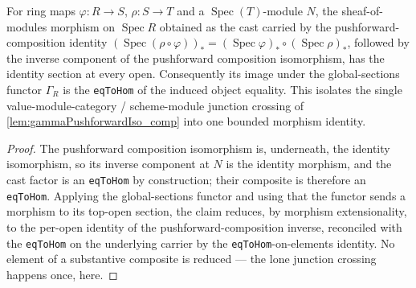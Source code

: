 \begin{lemma}


  \label{lem:gammaPushforwardIso_comp_bridge}
  For ring maps \(\varphi : R \to S\), \(\rho : S \to T\) and a
  \(\operatorname{Spec}(T)\)-module \(N\), the sheaf-of-modules morphism on
  \(\operatorname{Spec} R\) obtained as the cast carried by the pushforward-composition
  identity \((\operatorname{Spec}(\rho\circ\varphi))_* = (\operatorname{Spec}\varphi)_*\circ
  (\operatorname{Spec}\rho)_*\), followed by the inverse component of the pushforward
  composition isomorphism, has the identity section at every open. Consequently its image
  under the global-sections functor \(\Gamma_R\) is the \texttt{eqToHom} of the induced
  object equality. This isolates the single value-module-category / scheme-module junction
  crossing of \cref{lem:gammaPushforwardIso_comp} into one bounded morphism identity.
\end{lemma}

\begin{proof}
  The pushforward composition isomorphism is, underneath, the identity isomorphism, so its
  inverse component at \(N\) is the identity morphism, and the cast factor is an
  \texttt{eqToHom} by construction; their composite is therefore an \texttt{eqToHom}.
  Applying the global-sections functor and using that the functor sends a morphism to its
  top-open section, the claim reduces, by morphism extensionality, to the per-open identity
  of the pushforward-composition inverse, reconciled with the \texttt{eqToHom} on the
  underlying carrier by the \texttt{eqToHom}-on-elements identity. No element of a
  substantive composite is reduced — the lone junction crossing happens once, here.
\end{proof}

